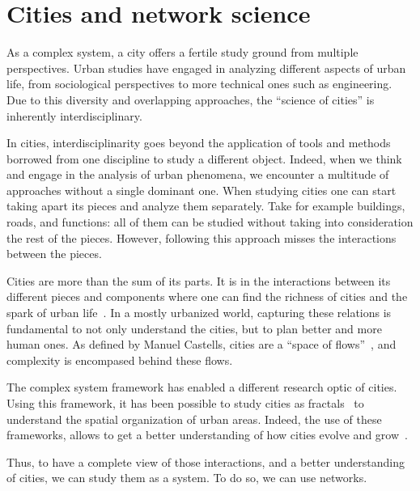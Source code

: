\section{Cities and network science}


As a complex system, a city offers a fertile study ground from multiple perspectives. Urban studies have engaged in analyzing different aspects of urban life, from sociological perspectives to more technical ones such as engineering. Due to this diversity and overlapping approaches, the ``science of cities'' is inherently interdisciplinary.

In cities, interdisciplinarity goes beyond the application of tools and methods borrowed from one discipline to study a different object. Indeed, when we think and engage in the analysis of urban phenomena, we encounter a multitude of approaches without a single dominant one. When studying cities one can start taking apart its pieces and analyze them separately. Take for example buildings, roads, and functions: all of them can be studied without taking into consideration the rest of the pieces. However, following this approach misses the interactions between the pieces. 

Cities are more than the sum of its parts. It is in the interactions between its different pieces and components where one can find the richness of cities and the spark of urban life~\cite{Jacobs1961Death}. In a mostly urbanized world, capturing these relations is fundamental to not only understand the cities, but to plan better and more human ones. As defined by Manuel Castells, cities are a ``space of flows''~\cite{castells1989informational}, and complexity is encompased behind these flows. %

The complex system framework has enabled a different research optic of cities. Using this framework, it has been possible to study cities as fractals~\cite{batty1996preliminary} to understand the spatial organization of urban areas. Indeed, the use of these frameworks, allows to get a better understanding of how cities evolve and grow~\cite{makse1995growth}. %

Thus, to have a complete view of those interactions, and a better understanding of cities, we can study them as a system. To do so, we can use networks.

